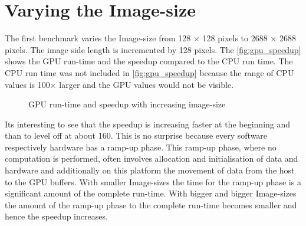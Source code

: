 \section{Varying the Image-size} %
\label{sec:varying_the_image_size}
The first benchmark varies the Image-size from 128 $\times$ 128 pixels to 2688
$\times$ 2688 pixels. The image side length is incremented by 128 pixels. The
\autoref{fig:gpu_speedup} shows the \gls{GPU} run-time and the speedup compared
to the \gls{CPU} run time. The \gls{CPU} run time was not included in
\autoref{fig:gpu_speedup} because the range of \gls{CPU} values is 100$\times$ 
larger and the \gls{GPU} values would not be visible. 
\begin{figure}[ht]
	\centering
		\caption{\protect\gls{GPU} run-time and speedup with increasing image-size}%
		\label{fig:gpu_speedup}%
	\end{figure}
Its interesting to see that the speedup is increasing faster at the beginning
and than to level off at about 160. This is no surprise because every software
respectively hardware has a ramp-up phase. This ramp-up phase, where no
computation is performed, often involves allocation and initialisation of data
and hardware and additionally on this platform the movement of data from the
host to the \gls{GPU} buffers. With smaller Image-sizes the time for the ramp-up
phase is a significant amount of the complete run-time. With bigger and bigger
Image-sizes the amount of the ramp-up phase to the complete run-time becomes 
smaller and hence the speedup increases. 

